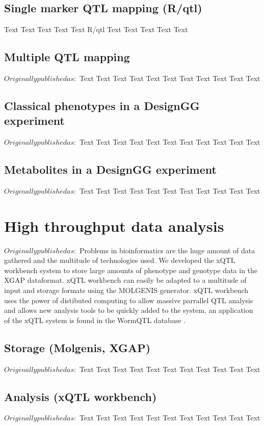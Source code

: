 \documentclass[11pt, twoside, a5paper]{report}
\begin{document}
\section{Single marker QTL mapping (R/qtl)}
Text Text Text Text Text R/qtl\cite{Broman:2003, Arends:2010} Text Text Text Text Text

\section{Multiple QTL mapping}
$ Originally published as: $
Text Text Text Text Text Text Text Text Text Text Text

\section{Classical phenotypes in a DesignGG experiment}
$Originally published as: $
Text Text Text Text Text Text Text Text Text Text Text

\section{Metabolites in a DesignGG experiment}
$Originally published as: $
Text Text Text Text Text Text Text Text Text Text Text

\chapter{High throughput data analysis}
$ Originally published as: $
Problems in bioinformatics are the huge amount of data gathered and the multitude of technologies used. We 
developed the xQTL workbench system\cite{Arends:2012} to store large amounts of phenotype and genotype data 
in the XGAP\cite{Swertz:2010} dataformat. xQTL workbench can easily be adapted to a multitude of input and 
storage formats using the MOLGENIS\cite{Swertz:2004} generator. xQTL workbench uses the power of distibuted 
computing to allow massive parrallel QTL analysis and allows new analysis tools to be quickly added to the 
system, an application of the xQTL system is found in the WormQTL database \cite{Snoek:2012}.

\section{Storage (Molgenis, XGAP)}
$ Originally published as: $
Text Text Text Text Text Text Text Text Text Text Text

\section{Analysis (xQTL workbench)}
$ Originally published as: $
Text Text Text Text Text Text Text Text Text Text Text
\end{document}
